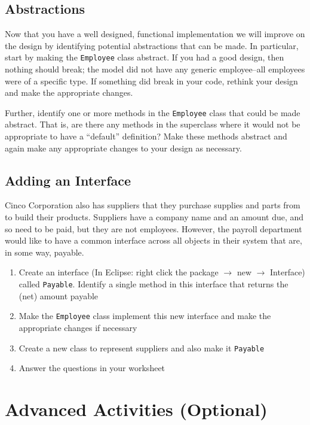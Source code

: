 \documentclass[12pt]{scrartcl}
\begin{document}
\subsection*{Abstractions}

Now that you have a well designed, functional implementation we will 
improve on the design by identifying potential abstractions that can 
be made.  In particular, start by making the \texttt{Employee} 
class abstract.  If you had a good design, then nothing should break; 
the model did not have any generic employee--all employees were of a 
specific type.  If something did break in your code, rethink your 
design and make the appropriate changes.

Further, identify one or more methods in the \texttt{Employee} 
class that could be made abstract.  That is, are there any methods in 
the superclass where it would not be appropriate to have a ``default'' 
definition?  Make these methods abstract and again make any appropriate 
changes to your design as necessary.

\subsection*{Adding an Interface}

Cinco Corporation also has suppliers that they purchase supplies 
and parts from to build their products.  Suppliers have a company 
name and an amount due, and so need to be paid, but they are not 
employees.  However, the payroll department would like to have a 
common interface across all objects in their system that are, in 
some way, payable.  

\begin{enumerate}
  \item Create an interface (In Eclipse: right click the package 
    $\rightarrow$ new $\rightarrow$ Interface) called 
    \texttt{Payable}.  Identify a single method in this 
    interface that returns the (net) amount payable
  \item Make the \texttt{Employee} class implement this 
    new interface and make the appropriate changes if necessary
  \item Create a new class to represent suppliers and also make it 
    \texttt{Payable}
  \item Answer the questions in your worksheet
\end{enumerate}

\section*{Advanced Activities (Optional)}
\end{document}
